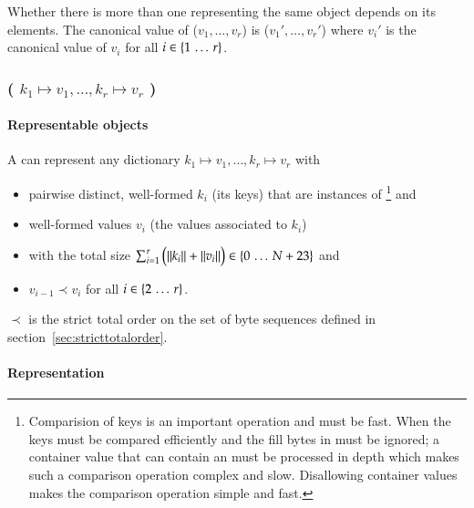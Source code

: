 Whether there is more than one \DborSequenceValue{} representing the same object depends on its
elements.
The canonical value of \DborSequenceValue{}($v_1, \ldots, v_r$) is
\DborSequenceValue($v_1', \ldots, v_r'$)
where $v_i'$ is the canonical value of $v_i$ for all $i \in \{1 \,\ldots\, r\}$.


\subsubsection{\DborDictionaryValue(\texorpdfstring{%
    $k_1 \mapsto v_1, \ldots, k_r \mapsto v_r$%
}{%
    k1 -> v1, ..., kr -> vr%
})}
\hypertarget{sec:def:DictionaryValue}{}

\paragraph{Representable objects}

A \DborDictionaryValue{} can represent any dictionary $k_1 \mapsto v_1, \ldots, k_r \mapsto v_r$ with
\begin{itemize}
    \item
    pairwise distinct, well-formed $k_i$ (its keys) that are instances of \DborElementaryValue
    \footnote{
        Comparision of keys is an important operation and must be fast.
        When the keys must be compared efficiently and the fill bytes in \DborAllocatedValue*{} must be
        ignored; a container value that can contain an \DborAllocatedValue*{} must be processed in depth
        which makes such a comparison operation complex and slow.
        Disallowing container values makes the comparison operation simple and fast.
    }
    and

    \item
    well-formed values $v_i$ (the values associated to $k_i$)

    \item
    with the total size $\sum_{i = 1}^r \big(\|k_i\| + \|v_i\|\big) \in \{0 \,\ldots\, N + 23\}$ and

    \item
    $v_{i - 1} \prec v_{i}$ for all $i \in \{2 \,\ldots\, r\}$.
\end{itemize}

${\prec}$ is the strict total order on the set of byte sequences defined in section~\ref{sec:stricttotalorder}.

\paragraph{Representation}

